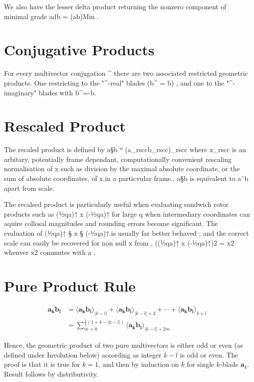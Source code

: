 \documentclass[a4paper]{book}
\numberwithin{equation}{chapter}
\begin{document}
We also have the lesser delta product returning the nonzero component of minimal grade adb = (ab)Min . 
    
    \section{Conjugative Products}

For every multivector conjugation ^ there are two associated restricted geometric products. One restricting to the "^-real" blades (b^ = b) , and one to the "^-imaginary" blades with b^=-b. 
    
    \section{Rescaled Product}

The recaled product is defined by a§b º (a_rsccb_rscc)_rscc where x_rscc is an arbitary, potentially frame dependant, computationally convenient rescaling normalisation of x such as division by the maximal absolute coordinate, or the sum of absolute coordinates, of x.in a particvular frame.. a§b is equivalent to a¨b apart from scale.

\vspace{\baselineskip}
    
The recalsed product is particularly useful when evaluating sandwich rotor products such as (½qa)↑ x (-½qa)↑ for large q when intermediary coordinates can aquire collosal magnitudes and rounding errors become significant. The evaluation of (½qa)↑ §  x § (-½qa)↑.is usually far better behaved ; and the correct scale can easily be recovered for non null x from , ((½qa)↑ x (-½qa)↑)2 =  x2 whenver x2 commutes with a .

    
    \section{Pure Product Rule}

\begin{align}
    \mathbf{a_k b_l} &= \langle \mathbf{a_k b_l} \rangle_{|k-l|}
    + \langle \mathbf{a_k b_l} \rangle_{|k-l|+2} + \cdots 
    + \langle \mathbf{a_k b_l} \rangle_{k+l} \\
    &= \sum_{m=0}^{ \frac{1}{2}(1+k-|k-l|)} \langle \mathbf{a_k b_l} \rangle_{|k-l|+2m}
\end{align}

Hence, the geometric product of two pure multivectors is either odd or even 
(as defined under Involution below) according as integer $k-l$ is odd or even. The
proof is that it is true for $k=1$, and then by induction on $k$ for single $k$-blade 
$\mathbf{a}_k$. Result follows by distributivity.
    
\end{document}
